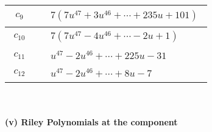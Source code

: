 \documentclass[1p]{elsarticle_modified}
\theoremstyle{definition}
\begin{document}
\begin{tabular}{m{50pt}|m{274pt}}
\hline $$\begin{aligned}c_{9}\end{aligned}$$&$\begin{aligned}
&7(7 u^{47}+3 u^{46}+\cdots+235 u+101)
\end{aligned}$\\
\hline $$\begin{aligned}c_{10}\end{aligned}$$&$\begin{aligned}
&7(7 u^{47}-4 u^{46}+\cdots-2 u+1)
\end{aligned}$\\
\hline $$\begin{aligned}c_{11}\end{aligned}$$&$\begin{aligned}
&u^{47}-2 u^{46}+\cdots+225 u-31
\end{aligned}$\\
\hline $$\begin{aligned}c_{12}\end{aligned}$$&$\begin{aligned}
&u^{47}-2 u^{46}+\cdots+8 u-7
\end{aligned}$\\
\hline
\end{tabular}\\~\\
\newpage\renewcommand{\arraystretch}{1}
\flushleft \textbf{(v) Riley Polynomials at the component}\newline \\
\end{document}
